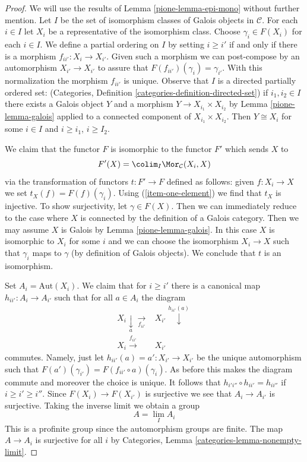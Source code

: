 \begin{proof}

We will use the results of Lemma \ref{pione-lemma-epi-mono} without further mention.
Let $I$ be the set of isomorphism classes of Galois objects in $\mathcal{C}$.
For each $i \in I$ let $X_i$ be a representative of the isomorphism class.
Choose $\gamma_i \in F(X_i)$ for each $i \in I$.
We define a partial ordering on $I$ by setting $i \geq i'$ if
and only if there is a morphism $f_{ii'} : X_i \to X_{i'}$.
Given such a morphism we can post-compose by an automorphism
$X_{i'} \to X_{i'}$ to assure that $F(f_{ii'})(\gamma_i) = \gamma_{i'}$.
With this normalization the morphism $f_{ii'}$ is unique.
Observe that $I$ is a directed partially ordered set:
(Categories, Definition \ref{categories-definition-directed-set})
if $i_1, i_2 \in I$ there exists a Galois object $Y$ and a morphism
$Y \to X_{i_1} \times X_{i_2}$ by Lemma \ref{pione-lemma-galois} applied
to a connected component of $X_{i_1} \times X_{i_2}$.
Then $Y \cong X_i$ for some $i \in I$ and $i \geq i_1$, $i \geq I_2$.

\medskip\noindent
We claim that the functor $F$ is isomorphic to the functor $F'$
which sends $X$ to
$$
F'(X) = \colim_I \Mor_\mathcal{C}(X_i, X)
$$
via the transformation of functors $t : F' \to F$ defined as follows:
given $f : X_i \to X$ we set $t_X(f) = F(f)(\gamma_i)$.
Using (\ref{item-one-element}) we find that $t_X$ is injective.
To show surjectivity, let $\gamma \in F(X)$. Then we can immediately
reduce to the case where $X$ is connected by the definition of
a Galois category. Then we may assume $X$ is Galois by
Lemma \ref{pione-lemma-galois}. In this case $X$ is isomorphic to $X_i$
for some $i$ and we can choose the isomorphism $X_i \to X$ such
that $\gamma_i$ maps to $\gamma$ (by definition of Galois objects).
We conclude that $t$ is an isomorphism.

\medskip\noindent
Set $A_i = \text{Aut}(X_i)$.
We claim that for $i \geq i'$ there is a canonical map
$h_{ii'} : A_i \to A_{i'}$ such that for all $a \in A_i$
the diagram
$$
\begin{array}{cc}X_i \underset{a}{\downarrow}\underset{f_{ii'}}{\longrightarrow} & X_{i'} \overset{h_{ii'}(a)}{\downarrow} \\ X_i \overset{f_{ii'}}{\longrightarrow} & X_{i'}\end{array}
$$
commutes. Namely, just let $h_{ii'}(a) = a' : X_{i'} \to X_{i'}$
be the unique automorphism such that
$F(a')(\gamma_{i'}) = F(f_{ii'} \circ a)(\gamma_i)$.
As before this makes the diagram commute and moreover the choice
is unique.
It follows that
$h_{i'i''} \circ h_{ii'} = h_{ii''}$
if $i \geq i' \geq i''$.
Since $F(X_i) \to F(X_{i'})$ is surjective we see that
$A_i \to A_{i'}$ is surjective.
Taking the inverse limit we obtain a group
$$
A = \lim_I A_i
$$
This is a profinite group since the automorphism groups are finite.
The map $A \to A_i$ is surjective for all $i$ by
Categories, Lemma \ref{categories-lemma-nonempty-limit}.


\end{proof}

